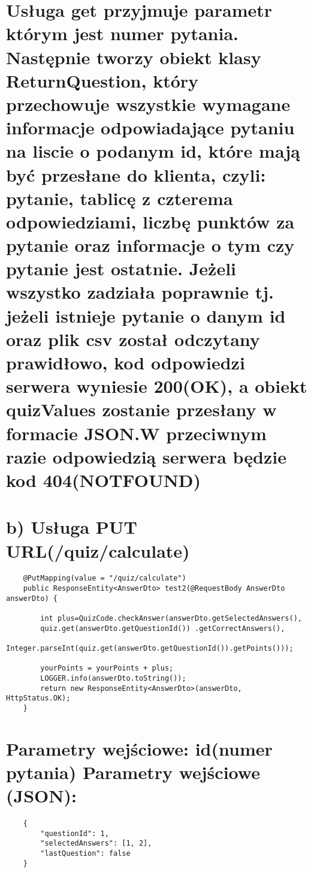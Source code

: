 \documentclass[a4paper]{article}
\newcounter{para}
\begin{document}
\section*{\large\hspace*{8mm} Usługa get przyjmuje parametr którym jest numer pytania. Następnie tworzy obiekt klasy ReturnQuestion, który przechowuje wszystkie wymagane informacje odpowiadające pytaniu na liscie o podanym id, które mają być przesłane do klienta, czyli: pytanie, tablicę z czterema odpowiedziami, liczbę punktów za pytanie oraz informacje o tym czy pytanie jest ostatnie. 
Jeżeli wszystko zadziała poprawnie tj. jeżeli istnieje pytanie o danym id oraz plik csv został odczytany prawidłowo, kod odpowiedzi serwera wyniesie 200(OK), a obiekt quizValues zostanie przesłany w formacie JSON.W przeciwnym razie odpowiedzią serwera będzie kod 404(NOTFOUND)\newline
}\par

\section*{\large\hspace*{8mm} b) Usługa PUT URL(/quiz/calculate)
}\par
\small
\begin{lstlisting}
    @PutMapping(value = "/quiz/calculate")
    public ResponseEntity<AnswerDto> test2(@RequestBody AnswerDto answerDto) {
    
        int plus=QuizCode.checkAnswer(answerDto.getSelectedAnswers(),
        quiz.get(answerDto.getQuestionId()) .getCorrectAnswers(),
        Integer.parseInt(quiz.get(answerDto.getQuestionId()).getPoints()));
        
        yourPoints = yourPoints + plus;
        LOGGER.info(answerDto.toString());
        return new ResponseEntity<AnswerDto>(answerDto, HttpStatus.OK);
    }
\end{lstlisting}
\section*{\large\hspace*{8mm}Parametry wejściowe: id(numer pytania)\newline
\hspace*{8mm}Parametry wejściowe (JSON):}\par
\small
\begin{lstlisting}
    {
        "questionId": 1,
        "selectedAnswers": [1, 2],
        "lastQuestion": false
    }
\end{lstlisting}
\end{document}
